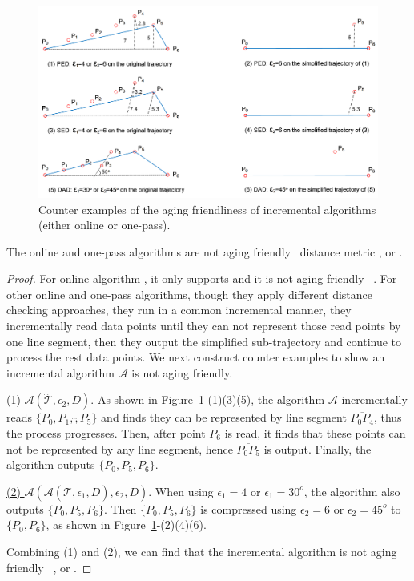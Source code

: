 	
\begin{figure}[tb!]
	\centering
	\includegraphics[scale=0.66]{Figures/Fig-aging-incre.png}
	
	\caption{\small Counter examples of the aging friendliness of incremental algorithms (either online or one-pass).}
	\vspace{-2ex}
	\label{fig:aging-incre}
\end{figure}

\begin{theorem}
	\label{theo-aging-online}
	The online and one-pass algorithms are not aging friendly \wrt~distance metric \ped, \sed or \dad.

\end{theorem}

\begin{proof}
	For online algorithm \squishe, it only supports \sed and it is not aging friendly \wrt~\sed.
	For other online and one-pass algorithms, though they apply different distance checking approaches, they run in a common incremental manner, \ie they incrementally read data points until they can not represent those read points by one line segment, then they output the simplified sub-trajectory and continue to process the rest data points. We next construct counter examples to show an incremental algorithm $\mathcal{A}$ is not aging friendly.
	
	\underline{(1) ${\mathcal{A}}(\dddot{\mathcal{T}}, \epsilon_2, D)$}. As shown in Figure~\ref{fig:aging-incre}-(1)(3)(5), the algorithm $\mathcal{A}$ incrementally reads $\{P_0, P_1,\dddot, P_5\}$ and finds they can be represented by line segment $\overline{P_0P_4}$, thus the process progresses. Then, after point $P_6$ is read, it finds that these points can not be represented by any line segment, hence $\overline{P_0P_5}$ is output. Finally, the algorithm outputs $\{P_0, P_5, P_6\}$.
	
	\underline{(2) ${\mathcal{A}}(\mathcal{A}(\dddot{\mathcal{T}}, \epsilon_1, D), \epsilon_2, D)$}. When using $\epsilon_1=4$ or $\epsilon_1=30^o $, the algorithm also outputs $\{P_0, P_5, P_6\}$. Then $\{P_0, P_5, P_6\}$ is compressed using $\epsilon_2=6$ or $\epsilon_2=45^o$ to $\{P_0, P_6\}$, as shown in Figure~\ref{fig:aging-incre}-(2)(4)(6).
	
	Combining (1) and (2), we can find that the incremental algorithm is not aging friendly \wrt~\ped, \sed or \dad.
\end{proof}

